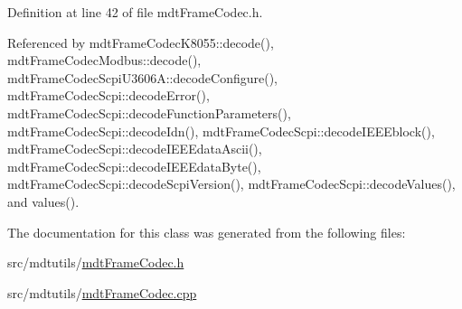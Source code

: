 Definition at line 42 of file mdt\-Frame\-Codec.\-h.



Referenced by mdt\-Frame\-Codec\-K8055\-::decode(), mdt\-Frame\-Codec\-Modbus\-::decode(), mdt\-Frame\-Codec\-Scpi\-U3606\-A\-::decode\-Configure(), mdt\-Frame\-Codec\-Scpi\-::decode\-Error(), mdt\-Frame\-Codec\-Scpi\-::decode\-Function\-Parameters(), mdt\-Frame\-Codec\-Scpi\-::decode\-Idn(), mdt\-Frame\-Codec\-Scpi\-::decode\-I\-E\-E\-Eblock(), mdt\-Frame\-Codec\-Scpi\-::decode\-I\-E\-E\-Edata\-Ascii(), mdt\-Frame\-Codec\-Scpi\-::decode\-I\-E\-E\-Edata\-Byte(), mdt\-Frame\-Codec\-Scpi\-::decode\-Scpi\-Version(), mdt\-Frame\-Codec\-Scpi\-::decode\-Values(), and values().



The documentation for this class was generated from the following files\-:\begin{DoxyCompactItemize}
\item 
src/mdtutils/\hyperlink{mdt_frame_codec_8h}{mdt\-Frame\-Codec.\-h}\item 
src/mdtutils/\hyperlink{mdt_frame_codec_8cpp}{mdt\-Frame\-Codec.\-cpp}\end{DoxyCompactItemize}
